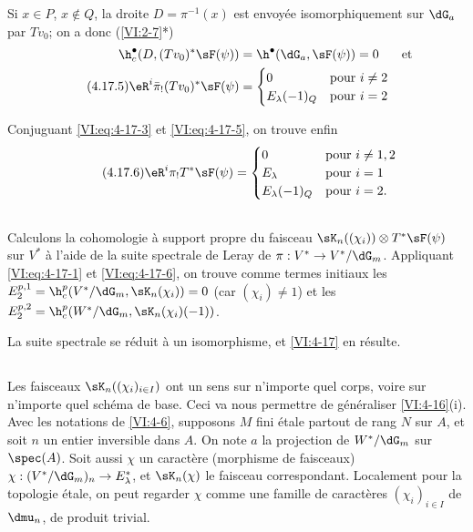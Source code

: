 Si $x\in P$, $x\notin Q$, la droite $D=\pi^{-1}(x)$ est envoyée 
isomorphiquement sur $\dG_a$ par $T v_0$; on a donc 
(\ref{VI:2-7}*) 
\begin{align} \notag 
  \h_c^\bullet(D,(T v_0)^\ast \sF(\psi)) &= \h^\bullet(\dG_a,\sF(\psi)) = 0 && \text{et} \\
  \tag{4.17.5}\label{VI:eq:4-17-5}
  \eR^i \bar\pi_! (T v_0)^\ast \sF(\psi) 
    &= \begin{cases} 
         0 & \text{pour $i\ne 2$} \\
         E_\lambda(-1)_Q & \text{pour $i=2$} 
       \end{cases} 
\end{align}

Conjuguant \eqref{VI:eq:4-17-3} et \eqref{VI:eq:4-17-5}, on trouve enfin 
\begin{equation*}\tag{4.17.6}\label{VI:eq:4-17-6}
  \eR^i \pi_! T^\ast\sF(\psi) = 
    \begin{cases}
      0 & \text{pour $i\ne 1,2$} \\
      E_\lambda & \text{pour $i=1$} \\
      E_\lambda(-1)_Q & \text{pour $i=2$.} 
    \end{cases}
\end{equation*}





\subsection{}\label{VI:4-18}

Calculons la cohomologie à support propre du faisceau 
$\sK_n((\chi_i))\otimes T^\ast \sF(\psi)$ sur $V^\ast$ à l'aide de la suite 
spectrale de Leray de $\pi:V^\ast\to V^\ast/\dG_m$. Appliquant 
\eqref{VI:eq:4-17-1} et \eqref{VI:eq:4-17-6}, on trouve comme termes initiaux 
les $E_2^{p,1} = \h_c^p(V^\ast/\dG_m,\sK_n(\chi_i)) = 0$ (car $(\chi_i)\ne 1$) 
et les $E_2^{p,2} = \h_c^p(W^\ast/\dG_m,\sK_n(\chi_i)(-1))$. 

La suite spectrale se réduit à un isomorphisme, et \ref{VI:4-17} en 
résulte. 





\subsection{}\label{VI:4-19}

Les faisceaux $\sK_n((\chi_i)_{i\in I})$ ont un sens sur n'importe quel corps, 
voire sur n'importe quel schéma de base. Ceci va nous permettre de généraliser 
\ref{VI:4-16}(i). Avec les notations de \ref{VI:4-6}, supposons $M$ fini 
étale partout de rang $N$ sur $A$, et soit $n$ un entier inversible dans $A$. 
On note $a$ la projection de $W^\ast/\dG_m$ sur $\spec(A)$. Soit aussi $\chi$ 
un caractère (morphisme de faisceaux) 
$\chi:(V^\ast/\dG_m)_n \to E_\lambda^\ast$, et $\sK_n(\chi)$ le faisceau 
correspondant. Localement pour la topologie étale, on peut regarder $\chi$ 
comme une famille de caractères $(\chi_i)_{i\in I}$ de $\dmu_n$, de produit 
trivial. 





